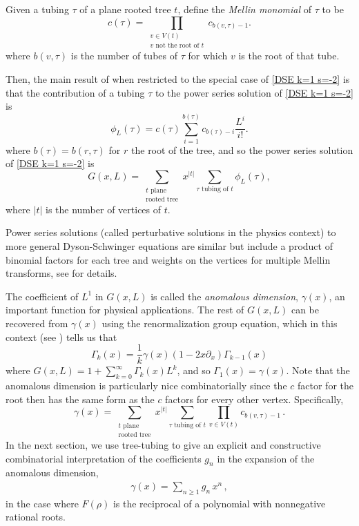 \documentclass[oneside]{amsart}
\theoremstyle{definition}
\begin{document}
Given a tubing $\tau$ of a plane rooted tree $t$, define the \emph{Mellin monomial} of $\tau$ to be
\[
c(\tau) = \prod_{\substack{v\in V(t) \\  v \text{ not the root of $t$}}} c_{b(v,\tau)-1}.
\]
where $b(v, \tau)$ is the number of tubes of $\tau$ for which $v$ is the root of that tube.

Then, the main result of \cite{BCEFNOHY} when restricted to the special case of \eqref{DSE k=1 s=-2} is that the contribution of a tubing $\tau$ to the power series solution of \eqref{DSE k=1 s=-2} is
\[
\phi_L(\tau) = c(\tau)\sum_{i=1}^{b(\tau)}c_{b(\tau)-i} \frac{L^i}{i!}.
\]
where $b(\tau) = b(r, \tau)$ for $r$ the root of the tree, and so the power series solution of \eqref{DSE k=1 s=-2} is
\begin{equation}\label{eq tubing soln}
G(x,L) = \sum_{\substack{t \text{ plane }\\\text{rooted tree}}} x^{|t|} \sum_{\tau \text{ tubing of }t}\phi_L(\tau),
\end{equation}
where $|t|$ is the number of vertices of $t$.

Power series solutions (called perturbative solutions in the physics context) to more general Dyson-Schwinger equations are similar but include a product of binomial factors for each tree and weights on the vertices for multiple Mellin transforms, see \cite{BCEFNOHY} for details.

The coefficient of $L^1$ in $G(x,L)$ is called the \emph{anomalous dimension}, $\gamma(x)$, an important function for physical applications.  The rest of $G(x,L)$ can be recovered from $\gamma(x)$ using the renormalization group equation, which in this context (see \cite{Ymem}) tells us that
\[
\Gamma_k(x) = \frac{1}{k} \gamma(x) \left( 1-2x \partial_x \right) \Gamma_{k-1}(x) 
\]
where $G(x,L) = 1+\sum_{k= 0}^\infty \Gamma_k(x)L^k$, and so $\Gamma_1(x) = \gamma(x)$.
Note that the anomalous dimension is particularly nice combinatorially since the $c$ factor for the root then has the same form as the $c$ factors for every other vertex.  Specifically,
\begin{equation}\label{eq anomalous dim}
\gamma(x) = \sum_{\substack{t \text{ plane }\\\text{rooted tree}}} x^{|t|} \sum_{\tau \text{ tubing of }t} \prod_{v\in V(t)} c_{b(v,\tau)-1}\,.
\end{equation}
In the next section, we use tree-tubing to give an explicit and constructive combinatorial interpretation of the  coefficients $g_n$ in the expansion of the anomalous dimension,
\begin{align} \gamma(x)=\sum_{n\geq 1} g_n\, x^n\,, \label{eq:gn} \end{align}
in the case where $F(\rho)$ is the reciprocal of a polynomial with nonnegative rational roots.
%
\end{document}
